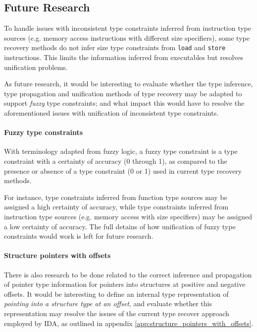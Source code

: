 
\subsection{Future Research}


To handle issues with inconsistent type constraints inferred from instruction type sources (e.g. memory access instructions with different size specifiers), some type recovery methods do not infer size type constraints from \texttt{load} and \texttt{store} instructions. This limits the information inferred from executables but resolves unification problems.

As future research, it would be interesting to evaluate whether the type inference, type propagation and unification methods of type recovery may be adapted to support \textit{fuzzy} type constraints; and what impact this would have to resolve the aforementioned issues with unification of inconsistent type constraints.

\paragraph{Fuzzy type constraints} With terminology adapted from fuzzy logic, a fuzzy type constraint is a type constraint with a certainty of accuracy (0 through 1), as compared to the presence or absence of a type constraint (0 or 1) used in current type recovery methods.

For instance, type constraints inferred from function type sources may be assigned a high certainty of accuracy, while type constraints inferred from instruction type sources (e.g. memory access with size specifiers) may be assigned a low certainty of accuracy. The full detains of how unification of fuzzy type constraints would work is left for future research.

\paragraph{Structure pointers with offsets} There is also research to be done related to the correct inference and propagation of pointer type information for pointers into structures at positive and negative offsets. It would be interesting to define an internal type representation of \textit{pointing into a structure type at an offset}, and evaluate whether this representation may resolve the issues of the current type recover approach employed by IDA, as outlined in appendix \ref{app:structure_pointers_with_offsets}.
